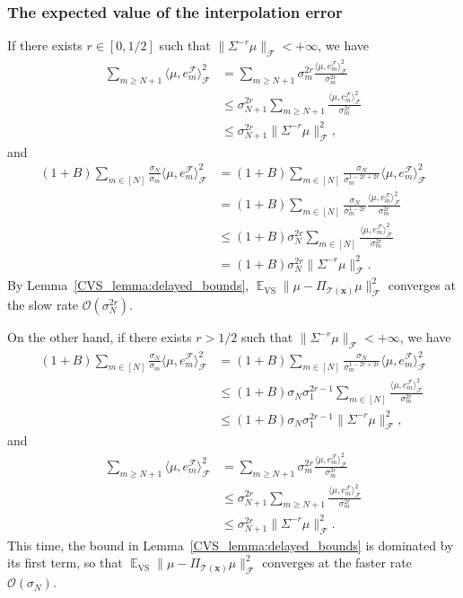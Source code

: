 \documentclass[twoside,11pt]{book}
\numberwithin{theorem}{chapter}
\numberwithin{definition}{chapter}
\numberwithin{proposition}{chapter}
\numberwithin{corollary}{chapter}
\numberwithin{example}{chapter}
\numberwithin{lemma}{chapter}
\numberwithin{assumption}{chapter}
\numberwithin{equation}{chapter}
\numberwithin{figure}{chapter}
\DeclareMathOperator{\VS}{\mathrm{VS}}
\DeclareMathOperator{\EX}{\mathbb{E}}
\DeclareMathOperator{\F}{\mathcal{F}}
\begin{document}
\subsubsection{The expected value of the interpolation error}
If there exists $r \in [0,1/2]$ such that $\displaystyle \| \Sigma^{-r} \mu \|_{\F} < +\infty$, we have
\begin{align}
\sum\limits_{m \geq N+1} \langle \mu,e_{m}^{\F} \rangle_{\F}^{2}
& = \sum\limits_{m \geq N+1} \sigma_{m}^{2r} \frac{ \langle \mu,e_{m}^{\F} \rangle_{\F}^{2}}{\sigma_{m}^{2r}} \\
& \leq \sigma_{N+1}^{2r} \sum\limits_{m \geq N+1} \frac{ \langle \mu,e_{m}^{\F} \rangle_{\F}^{2}}{\sigma_{m}^{2r}} \\
& \leq \sigma_{N+1}^{2r} \|\Sigma^{-r} \mu\|_{\F}^{2},
\end{align}
and
\begin{align}
(1+B) \sum\limits_{m \in [N]} \frac{\sigma_{N}}{\sigma_{m}} \langle \mu,e_{m}^{\F} \rangle_{\F}^{2}
& = (1+B) \sum\limits_{m \in [N]} \frac{\sigma_{N}}{\sigma_{m}^{1-2r+2r}} \langle \mu,e_{m}^{\F} \rangle_{\F}^{2} \\
& = (1+B) \sum\limits_{m \in [N]} \frac{\sigma_{N}}{\sigma_{m}^{1-2r}} \frac{\langle \mu,e_{m}^{\F} \rangle_{\F}^{2}}{\sigma_{m}^{2r}} \\
& \leq (1+B) \sigma_{N}^{2r} \sum\limits_{m \in [N]} \frac{\langle \mu,e_{m}^{\F} \rangle_{\F}^{2}}{\sigma_{m}^{2r}} \\
& = (1+B) \sigma_{N}^{2r} \|\Sigma^{-r} \mu\|_{\F}^{2}.
\end{align}
By Lemma~\ref{CVS_lemma:delayed_bounds}, $\displaystyle \EX_{\VS}\| \mu - \Pi_{\mathcal{T}(\bm{x})} \mu \|_{\F}^{2}$ converges at the slow rate $\mathcal{O}(\sigma_{N}^{2r})$.

On the other hand, if there exists $r > 1/2$ such that $\displaystyle \| \Sigma^{-r} \mu \|_{\F} < +\infty$, we have
\begin{align}
(1+B) \sum\limits_{m \in [N]} \frac{\sigma_{N}}{\sigma_{m}} \langle \mu,e_{m}^{\F} \rangle_{\F}^{2}
& = (1+B) \sum\limits_{m \in [N]} \frac{\sigma_{N}}{\sigma_{m}^{1-2r+2r}} \langle \mu,e_{m}^{\F} \rangle_{\F}^{2} \\
& \leq (1+B) \sigma_{N} \sigma_{1}^{2r-1} \sum\limits_{m \in [N]} \frac{\langle \mu,e_{m}^{\F} \rangle_{\F}^{2}}{\sigma_{m}^{2r}} \\
&  \leq (1+B) \sigma_{N} \sigma_{1}^{2r-1} \|\Sigma^{-r} \mu\|_{\F}^{2},
\end{align}
and
\begin{align}
\sum\limits_{m \geq N+1} \langle \mu,e_{m}^{\F} \rangle_{\F}^{2}
& = \sum\limits_{m \geq N+1} \sigma_{m}^{2r} \frac{ \langle \mu,e_{m}^{\F} \rangle_{\F}^{2}}{\sigma_{m}^{2r}} \\
& \leq \sigma_{N+1}^{2r} \sum\limits_{m \geq N+1} \frac{ \langle \mu,e_{m}^{\F} \rangle_{\F}^{2}}{\sigma_{m}^{2r}} \\
& \leq \sigma_{N+1}^{2r} \|\Sigma^{-r} \mu\|_{\F}^{2}.
\end{align}
This time, the bound in Lemma~\ref{CVS_lemma:delayed_bounds} is dominated by its first term, so that $\displaystyle \EX_{\VS}\| \mu - \Pi_{\mathcal{T}(\bm{x})} \mu \|_{\F}^{2}$ converges at the faster rate $\mathcal{O}(\sigma_{N})$.
\end{document}
